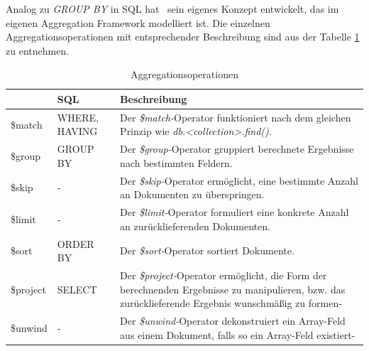 Analog zu \textit{GROUP BY} in SQL hat \mongo\ sein eigenes Konzept entwickelt, das im eigenen Aggregation Framework modelliert ist. Die einzelnen Aggregationsoperationen mit entsprechender Beschreibung sind aus der Tabelle \ref{table:aggrOperators} zu entnehmen. %
\begin{table}[H]
\centering
\begin{tabular}{lp{2.3cm}p{10.3cm}}
\toprule 
    \rowcolor{gray!50}
	\mongo & SQL & Beschreibung\\
	\midrule
	\$match & WHERE, HAVING & Der \textit{\$match-}Operator funktioniert nach dem gleichen Prinzip wie \textit{db.<collection>.find({})}.\\
	\$group & GROUP BY & Der \textit{\$group-}Operator gruppiert berechnete Ergebnisse nach bestimmten Feldern.\\
	\$skip & - & Der \textit{\$skip-}Operator ermöglicht, eine bestimmte Anzahl an Dokumenten zu überspringen.\\
	\$limit & - & Der \textit{\$limit-}Operator formuliert eine konkrete Anzahl an zurücklieferenden Dokumenten.\\
	\$sort & ORDER BY & Der \textit{\$sort-}Operator sortiert Dokumente.\\
	\$project  & SELECT & Der \textit{\$project-}Operator ermöglicht, die Form der berechnenden Ergebnisse zu manipulieren, bzw. das zurücklieferende Ergebnis wunschmäßig zu formen-\\
	\$unwind  & - & Der \textit{\$unwind-}Operator dekonstruiert ein Array-Feld aus einem Dokument, falls so ein Array-Feld existiert-\\
	\bottomrule
\end{tabular}
\caption[Aggregationsoperationen]{Aggregationsoperationen}
\label{table:aggrOperators}
\end{table}

